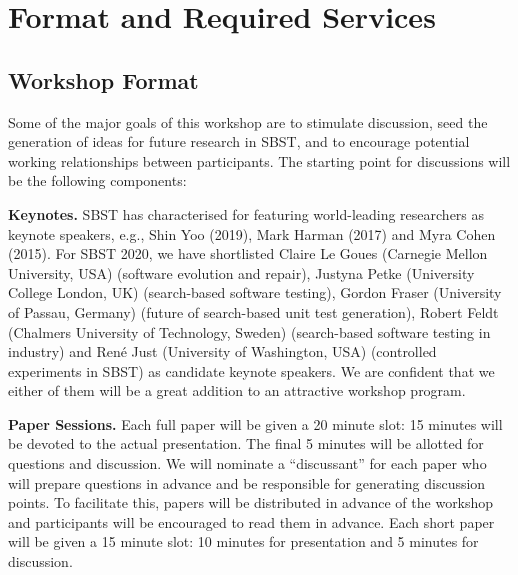 \documentclass[sigconf,review]{acmart}
\newcommand{\TODO}[1]{\textbf{\textcolor{ScarletRed}{[TODO: #1]}}\xspace}
\newcommand{\TODO}[1]{}
\begin{document}
\section{Format and Required Services}

\subsection{Workshop Format}

Some of the major goals of this workshop are to stimulate discussion,
seed the generation of ideas for future research in SBST, and to
encourage potential working relationships between participants.  The
starting point for discussions will be the following components:

{\bf Keynotes.}  SBST has characterised for featuring world-leading
researchers as keynote speakers, e.g., Shin Yoo (2019), Mark Harman
(2017) and Myra Cohen (2015). For SBST 2020, we have shortlisted
Claire Le Goues (Carnegie Mellon University, USA) (software evolution
and repair), Justyna Petke (University College London, UK)
(search-based software
testing), %
Gordon Fraser (University of Passau, Germany) (future of search-based
unit test generation), Robert Feldt (Chalmers University of
Technology, Sweden) (search-based software testing in industry) and
Ren\'e Just (University of Washington, USA) (controlled experiments in
SBST) as candidate keynote speakers. We are confident that we either
of them will be a great addition to an attractive workshop program.

{\bf Paper Sessions.}  Each full paper will be given a 20
minute slot: 15 minutes will be devoted to the
actual presentation.  The final 5 minutes will be allotted for
questions and discussion.  We will nominate a ``discussant'' for each
paper who will prepare questions in advance and be responsible for
generating discussion points. To facilitate this, papers will be
distributed in advance of the workshop and participants will be
encouraged to read them in advance.  Each short paper will be given
a 15 minute slot: 10 minutes for presentation and 5 minutes for discussion.
\end{document}
